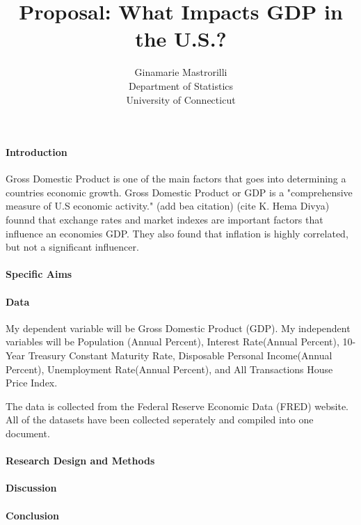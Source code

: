 \documentclass[12pt]{article}
\title{Proposal: What Impacts GDP in the U.S.? }
\author{Ginamarie Mastrorilli\\
  Department of Statistics\\
  University of Connecticut
}
\begin{document}
\maketitle


\paragraph{Introduction}
Gross Domestic Product is one of the main factors that goes into determining a countries economic growth. Gross Domestic Product or GDP is a "comprehensive measure of U.S economic activity." (add bea citation) 
(cite K. Hema Divya) founnd that exchange rates and market indexes are important factors that influence an economies GDP. They also found that inflation is highly correlated, but not a significant influencer.  

\paragraph{Specific Aims}

\paragraph{Data}
My dependent variable will be Gross Domestic Product (GDP).
My independent variables will be Population (Annual Percent), Interest Rate(Annual Percent), 10-Year Treasury Constant Maturity Rate, Disposable Personal Income(Annual Percent), Unemployment Rate(Annual Percent), and All Transactions House Price Index. 

The data is collected from the Federal Reserve Economic Data (FRED) website. All of the datasets have been collected seperately and compiled into one document. 

\paragraph{Research Design and Methods}
\lipsum[4]

\paragraph{Discussion}
\lipsum[5] \citep{wild2004global}

\paragraph{Conclusion}
\lipsum[1]




\end{document}
